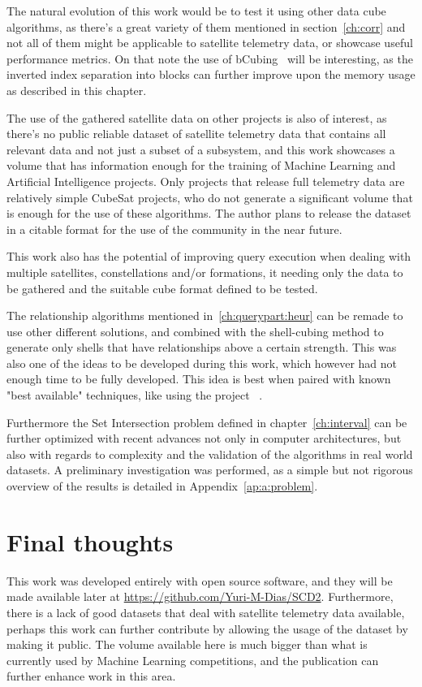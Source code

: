The natural evolution of this work would be to test it using other data cube algorithms, as there's a great variety of them mentioned in section~\ref{ch:corr} and not all of them might be applicable to satellite telemetry data, or showcase useful performance metrics.
On that note the use of bCubing~\cite{silva:2015:abordagensParaCubo} will be interesting, as the inverted index separation into blocks can further improve upon the memory usage as described in this chapter.

The use of the gathered satellite data on other projects is also of interest, as there's no public reliable dataset of satellite telemetry data that contains all relevant data and not just a subset of a subsystem, and this work showcases a volume that has information enough for the training of Machine Learning and Artificial Intelligence projects.
Only projects that release full telemetry data are relatively simple CubeSat projects, who do not generate a significant volume that is enough for the use of these algorithms.
The author plans to release the dataset in a citable format for the use of the community in the near future.

This work also has the potential of improving query execution when dealing with multiple satellites, constellations and/or formations, it needing only the data to be gathered and the suitable cube format defined to be tested.

The relationship algorithms mentioned in~\autoref{ch:querypart:heur} can be remade to use other different solutions, and combined with the shell-cubing method to generate only shells that have relationships above a certain strength.
This was also one of the ideas to be developed during this work, which however had not enough time to be fully developed.
This idea is best when paired with known "best available" techniques, like using the project ~\cite{LibrespacefoundationPolarisPolaris2021}.

Furthermore the Set Intersection problem defined in chapter~\ref{ch:interval} can be further optimized with recent advances not only in computer architectures, but also with regards to complexity and the validation of the algorithms in real world datasets.
A preliminary investigation was performed, as a simple but not rigorous overview of the results is detailed in Appendix~\ref{ap:a:problem}.

\section{Final thoughts}\label{ch:concl:future}

This work was developed entirely with open source software, and they will be made available later at \url{https://github.com/Yuri-M-Dias/SCD2}.
Furthermore, there is a lack of good datasets that deal with satellite telemetry data available, perhaps this work can further contribute by allowing the usage of the dataset by making it public.
The volume available here is much bigger than what is currently used by Machine Learning competitions, and the publication can further enhance work in this area.

